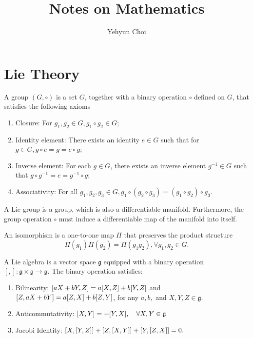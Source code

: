\documentclass{article}
\title{Notes on Mathematics}
\author{Yehyun Choi}
\begin{document}
\maketitle
\pagebreak

\section{Lie Theory}
 A group $(G,\circ)$ is a set $G$, together with a binary operation $\circ$ defined on $G$, that satisfies the following axioms
\begin{enumerate}
    \item Closure: For $g_1,g_2\in G,g_1\circ g_2\in G$;
    \item Identity element: There exists an identity $e\in G$ such that for $g\in G,g\circ e=g=e\circ g$;
    \item Inverse element: For each $g\in G$, there exists an inverse element $g^{-1}\in G$ such that $g\circ g^{-1}=e=g^{-1}\circ g$;
    \item Associativity: For all $g_1,g_2,g_3\in G,g_1\circ(g_2\circ g_3)=(g_1\circ g_2)\circ g_3.$
\end{enumerate}

 A Lie group is a group, which is also a differentiable manifold. Furthermore, the group operation $\circ$ must induce a differentiable map of the manifold into itself. 

 An isomorphism is a one-to-one map $\Pi$ that preserves the product structure 
$$\Pi(g_1)\Pi(g_2)=\Pi(g_1g_2),\forall g_1,g_2\in G.$$

 A Lie algebra is a vector space $\mathfrak g$ equipped with a binary operation $[,]:\mathfrak g\times\mathfrak g\to\mathfrak g$. The binary operation satisfies:
\begin{enumerate}
    \item Bilinearity: $\comm{aX+bY}{Z}=a\comm{X}{Z}+b\comm{Y}{Z}$ and $\comm{Z}{aX+bY}=a\comm{Z}{X}+b\comm{Z}{Y}$, for any $a,b,$ and $X,Y,Z\in\mathfrak{g}$.
    \item Anticommutativity: $\comm{X}{Y}=-\comm{Y}{X},\quad\forall X,Y\in\mathfrak{g}$
    \item Jacobi Identity: $\comm{X}{\comm{Y}{Z}}+\comm{Z}{\comm{X}{Y}}+\comm{Y}{\comm{Z}{X}}=0.$
\end{enumerate}

\pagebreak
\end{document}
